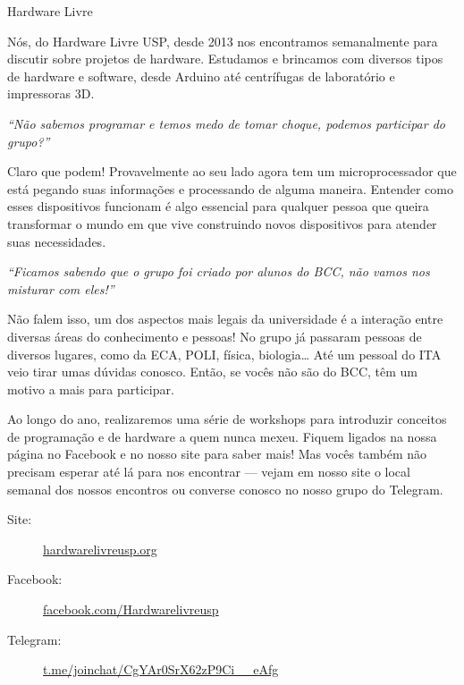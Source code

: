 \begin{subsecao}{Hardware Livre}


Nós, do Hardware Livre USP, desde 2013 nos encontramos semanalmente para
discutir sobre projetos de hardware. Estudamos e brincamos com diversos tipos de
hardware e software, desde Arduino até centrífugas de laboratório e impressoras
3D.

\textit{``Não sabemos programar e temos medo de tomar choque, podemos participar
do grupo?''}

Claro que podem! Provavelmente ao seu lado agora tem um microprocessador que
está pegando suas informações e processando de alguma maneira. Entender como
esses dispositivos funcionam é algo essencial para qualquer pessoa que queira
transformar o mundo em que vive construindo novos dispositivos para atender
suas necessidades.

\textit{``Ficamos sabendo que o grupo foi criado por alunos do BCC, não vamos
nos misturar com eles!''}

Não falem isso, um dos aspectos mais legais da universidade é a interação entre
diversas áreas do conhecimento e pessoas! No grupo já passaram pessoas de
diversos lugares, como da ECA, POLI, física, biologia… Até um pessoal do ITA
veio tirar umas dúvidas conosco. Então, se vocês não são do BCC, têm um motivo a
mais para participar.

Ao longo do ano, realizaremos uma série de workshops para introduzir conceitos 
de programação e de hardware a quem nunca mexeu. Fiquem ligados na nossa página 
no Facebook e no nosso site para saber mais! Mas vocês também não precisam 
esperar até lá para nos encontrar — vejam em nosso site o local semanal dos 
nossos encontros ou converse conosco no nosso grupo do Telegram.

\begin{description}
  \item[Site:] \url{hardwarelivreusp.org}
  \item[Facebook:] \url{facebook.com/Hardwarelivreusp}
  \item[Telegram:] \url{t.me/joinchat/CgYAr0SrX62zP9Ci__eAfg}
\end{description}

\end{subsecao}
